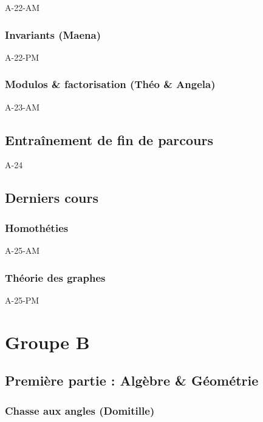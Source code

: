 \documentclass[poly,trombi]{valbonne}
\begin{document}
{A-22-AM}

\subsection{Invariants (Maena)}

{A-22-PM}

\subsection{Modulos \& factorisation (Théo \& Angela)}

{A-23-AM}


\section{Entraînement de fin de parcours}

{A-24}


\section{Derniers cours}

\subsection{Homothéties}
{A-25-AM}

\subsection{Théorie des graphes}

{A-25-PM}






\chapter{Groupe B}

\minitoc \clearpage

\section{Première partie : Algèbre \& Géométrie}

\subsection{Chasse aux angles (Domitille)}
\end{document}
